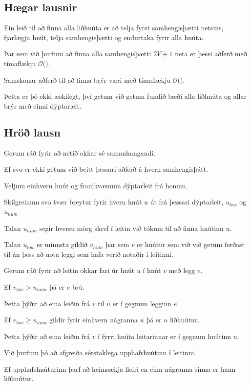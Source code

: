 \subsection{Hægar lausnir}
{
    {
        \item<1-> Ein leið til að finna alla liðhnúta er að telja fyrst samhengisþætti netsins, fjarlægja hnút, telja samhengisþætti
                    og endurtaka fyrir alla hnúta.
        \item<2-> Þar sem við þurfum að finna alla samhengisþætti $2V + 1$ neta er þessi aðferð með tímaflækju $\mathcal{O}($$)$.
        \item<4-> Samskonar aðferð til að finna brýr væri með tímaflækju $\mathcal{O}($$)$.
        \item<6-> Þetta er þó ekki æskilegt, því getum við getum fundið bæði alla liðhnúta og allar brýr með einni dýptarleit.
    }
}

\subsection{Hröð lausn}
{
    {
        \item<1-> Gerum ráð fyrir að netið okkar sé samanhangandi.
        \item<2-> Ef svo er ekki getum við beitt þessari aðferð á hvern samhengisþátt.
        \item<3-> Veljum einhvern hnút og framkvæmum dýptarleit frá honum.
        \item<4-> Skilgreinum svo tvær breytur fyrir hvern hnút $u$ út frá þessari dýptarleit, $u_{low}$ og $u_{num}$.
        \item<5-> Talan $u_{num}$ segir hversu mörg skref í leitin við tókum til að finna hnútinn $u$.
        \item<6-> Talan $u_{low}$ er minnsta gildið $v_{num}$ þar sem $v$ er hnútur sem við við getum ferðast til án þess að nota leggi
                    sem hafa verið notaðir í leitinni.
    }
}

{
    {
        \item<1-> Gerum ráð fyrir að leitin okkar fari úr hnút $u$ í hnút $v$ með legg $e$.
        \item<2-> Ef $v_{low} > u_{num}$ þá er $e$ brú.
        \item<3-> Þetta þýðir að eina leiðin frá $v$ til $u$ er í gegnum legginn $e$.
        \item<4-> Ef $v_{low} \geq u_{num}$ gildir fyrir einhvern nágranna $u$ þá er $u$ liðhnútur.
        \item<5-> Þetta þýðir að eina leiðin frá $v$ í fyrri hnúta leitarinnar er í gegnum hnútinn $u$.
        \item<6-> Við þurfum þó að afgreiða sérstaklega upphafshnútinn í leitinni.
        \item<7-> Ef upphafshnúturinn þarf að heimsækja fleiri en einn nágranna sinna er hann liðhnútur.
    }
}

